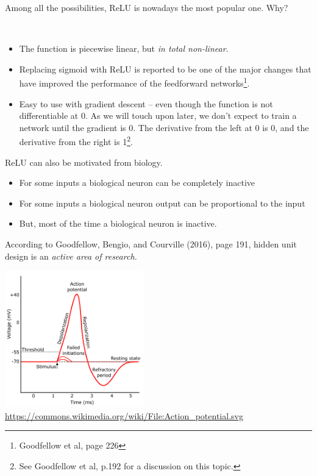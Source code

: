 \documentclass[10pt,ignorenonframetext,]{beamer}
\providecommand{\tightlist}{%
  \setlength{\itemsep}{0pt}\setlength{\parskip}{0pt}}
\begin{document}
\begin{frame}

Among all the possibilities, ReLU is nowadays the most popular one. Why?

\(~\)

\begin{itemize}
\item
  The function is piecewise linear, but \emph{in total non-linear}.
\item
  Replacing sigmoid with ReLU is reported to be one of the major changes
  that have improved the performance of the feedforward
  networks\footnote{Goodfellow et al, page 226}.
\item
  Easy to use with gradient descent -- even though the function is not
  differentiable at 0. As we will touch upon later, we don't expect to
  train a network until the gradient is 0. The derivative from the left
  at 0 is 0, and the derivative from the right is
  1\footnote{See Goodfellow et al, p.192 for a discussion on this topic.}.
\end{itemize}

\end{frame}

\begin{frame}

ReLU can also be motivated from biology.

\begin{itemize}
\tightlist
\item
  For some inputs a biological neuron can be completely inactive
\item
  For some inputs a biological neuron output can be proportional to the
  input
\item
  But, most of the time a biological neuron is inactive.
\end{itemize}

According to Goodfellow, Bengio, and Courville (2016), page 191, hidden
unit design is an \emph{active area of research.}

\centering
\includegraphics[width=0.45\textwidth,height=\textheight]{Action_potential.png}
\small
\url{https://commons.wikimedia.org/wiki/File:Action_potential.svg}

\end{frame}
\end{document}
